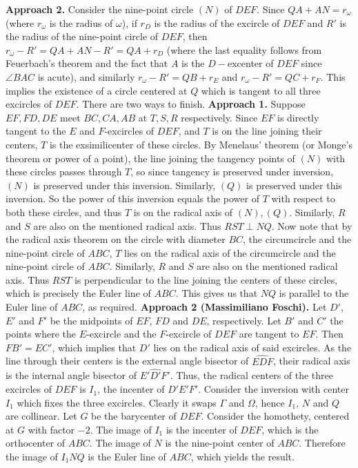 \textbf{Approach 2.} Consider the nine-point circle $(N)$ of $DEF$. Since $QA + AN = r_\omega$ (where $r_\omega$ is the radius of $\omega$), if $r_D$ is the radius of the excircle of $DEF$ and $R'$ is the radius of the nine-point circle of $DEF$, then $r_\omega - R' = QA + AN - R' = QA + r_D$ (where the last equality follows from Feuerbach's theorem and the fact that $A$ is the $D-$excenter of $DEF$ since $\angle BAC$ is acute), and similarly $r_\omega - R' = QB + r_E$ and $r_\omega - R' = QC + r_F$. This implies the existence of a circle centered at $Q$ which is tangent to all three excircles of $DEF$.\nl
There are two ways to finish.\nl
\textbf{Approach 1.} Suppose $EF, FD, DE$ meet $BC, CA, AB$ at $T, S, R$ respectively. Since $EF$ is directly tangent to the $E$ and $F$-excircles of $DEF$, and $T$ is on the line joining their centers, $T$ is the exsimilicenter of these circles. By Menelaus' theorem (or Monge's theorem or power of a point), the line joining the tangency points of $(N)$ with these circles passes through $T$, so since tangency is preserved under inversion, $(N)$ is preserved under this inversion. Similarly, $(Q)$ is preserved under this inversion. So the power of this inversion equals the power of $T$ with respect to both these circles, and thus $T$ is on the radical axis of $(N), (Q)$. Similarly, $R$ and $S$ are also on the mentioned radical axis. Thus ${RST} \perp NQ$. Now note that by the radical axis theorem on the circle with diameter $BC$, the circumcircle and the nine-point circle of $ABC$, $T$ lies on the radical axis of the circumcircle and the nine-point circle of $ABC$. Similarly, $R$ and $S$ are also on the mentioned radical axis. Thus $RST$ is perpendicular to the line joining the centers of these circles, which is precisely the Euler line of $ABC$. This gives us that $NQ$ is parallel to the Euler line of $ABC$, as required. \nl
\textbf{Approach 2 (Massimiliano Foschi).} Let $D'$, $E'$ and $F'$ be the midpoints of $EF$, $FD$ and $DE$, respectively. Let $B'$ and $C'$ the points where the $E$-excircle and the $F$-excircle of $DEF$ are tangent to $EF$. Then $FB'=EC'$, which implies that $D'$ lies on the radical axis of said excircles. As the line through their centers is the external angle bisector of $\widehat{EDF}$, their radical axis is the internal angle bisector of $\widehat{E'D'F'}$. Thus, the radical centers of the three excircles of $DEF$ is $I_1$, the incenter of $D'E'F'$.\nl
Consider the inversion with center $I_1$ which fixes the three excircles. Clearly it swaps $\Gamma$ and $\Omega$, hence $I_1$, $N$ and $Q$ are collinear. Let $G$ be the barycenter of $DEF$. Consider the homothety, centered at $G$ with factor $-2$. The image of $I_1$ is the incenter of $DEF$, which is the orthocenter of $ABC$. The image of $N$ is the nine-point center of $ABC$. Therefore the image of $I_1NQ$ is the Euler line of $ABC$, which yields the result.
